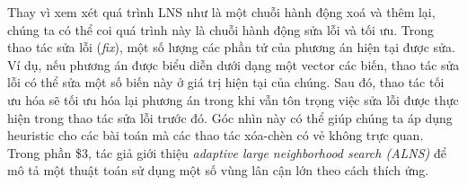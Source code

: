 Thay vì xem xét quá trình LNS như là một chuỗi hành động xoá và thêm lại, chúng ta có thể coi quá trình này là chuỗi hành động sửa lỗi và tối ưu. Trong thao tác sửa lỗi (\textit{fix}), một số lượng các phần tử của phương án hiện tại được sửa. Ví dụ, nếu phương án được biểu diễn dưới dạng một vector các biến, thao tác sửa lỗi có thể sửa một số biến này ở giá trị hiện tại của chúng. Sau đó, thao tác tối ưu hóa sẽ tối ưu hóa lại phương án trong khi vẫn tôn trọng việc sửa lỗi được thực hiện trong thao tác sửa lỗi trước đó. Góc nhìn này có thể giúp chúng ta áp dụng heuristic cho các bài toán mà các thao tác xóa-chèn có vẻ không trực quan. Trong phần \$3, tác giả giới thiệu \textit{adaptive large neighborhood search (ALNS)} để mô tả một thuật toán sử dụng một số vùng lân cận lớn theo cách thích ứng.
